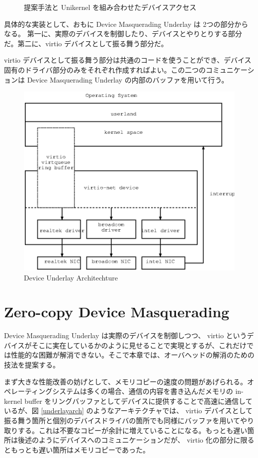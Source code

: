 \documentclass[a4paper,11pt,report]{ltjsbook}
\begin{document}
\begin{figure}[htbp]
\begin{minipage}{0.5\hsize}
\begin{center}
    \caption{提案手法と Unikernel を組み合わせたデバイスアクセス}
    \label{unduni}
  \end{center}
  \end{minipage}
\end{figure}

具体的な実装として、おもに Device Masquerading Underlay は 2つの部分からなる。
第一に、実際のデバイスを制御したり、デバイスとやりとりする部分だ。第二に、virtio デバイスとして振る舞う部分だ。

virtio デバイスとして振る舞う部分は共通のコードを使うことができ、デバイス固有のドライバ部分のみをそれぞれ作成すればよい。この二つのコミュニケーションは Device Masquerading Underlay の内部のバッファを用いて行う。

\begin{figure}[htbp]
  \begin{center}
    \includegraphics[width=.7\textwidth]{./archtech.eps}
    \caption{Device Underlay Architechture}
    \label{ulayarch}
  \end{center}
\end{figure}


\section{Zero-copy Device Masquerading}

Device Masquerading Underlay は実際のデバイスを制御しつつ、 virtio というデバイスがそこに実在しているかのように見せることで実現とするが、これだけでは性能的な困難が解消できない。そこで本章では、オーバヘッドの解消のための技法を提案する。

まず大きな性能改善の妨げとして、メモリコピーの速度の問題があげられる。オペレーティングシステムは多くの場合、通信の内容を書き込んだメモリの in-kernel buffer をリングバッファとしてデバイスに提供することで高速に通信しているが、図 \ref{underlayarch} のようなアーキテクチャでは、 virtio デバイスとして振る舞う箇所と個別のデバイスドライバの箇所でも同様にバッファを用いてやり取りする。これは不要なコピーが余計に増えていることになる。もっとも遅い箇所は後述のようにデバイスへのコミュニケーションだが、 virtio 化の部分に限るともっとも遅い箇所はメモリコピーであった。
\end{document}
